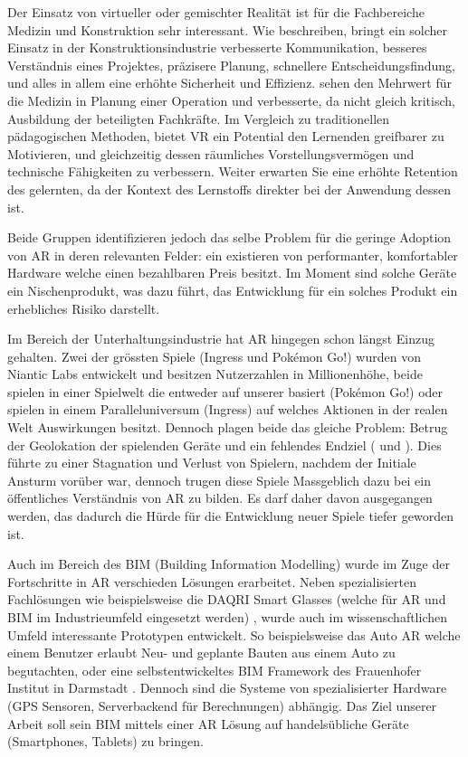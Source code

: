 \documentclass[a4paper]{scrreprt}
\begin{document}
Der Einsatz von virtueller oder gemischter Realität ist für die Fachbereiche Medizin und Konstruktion sehr interessant. Wie \citeauthor{Piroozfar2018} beschreiben, bringt ein solcher Einsatz in der Konstruktionsindustrie verbesserte Kommunikation, besseres Verständnis eines Projektes, präzisere Planung, schnellere Entscheidungsfindung, und alles in allem eine erhöhte Sicherheit und Effizienz. \citeauthor{Pelargos2017} sehen den Mehrwert für die Medizin in Planung einer Operation und verbesserte, da nicht gleich kritisch, Ausbildung der beteiligten Fachkräfte. Im Vergleich zu traditionellen pädagogischen Methoden, bietet VR ein Potential den Lernenden greifbarer zu Motivieren, und gleichzeitig dessen räumliches Vorstellungsvermögen und technische Fähigkeiten zu verbessern. Weiter erwarten Sie eine erhöhte Retention des gelernten, da der Kontext des Lernstoffs direkter bei der Anwendung dessen ist.

Beide Gruppen identifizieren jedoch das selbe Problem für die geringe Adoption von AR in deren relevanten Felder: ein existieren von performanter, komfortabler Hardware welche einen bezahlbaren Preis besitzt. Im Moment sind solche Geräte ein Nischenprodukt, was dazu führt, das Entwicklung für ein solches Produkt ein erhebliches Risiko darstellt.

Im Bereich der Unterhaltungsindustrie hat AR hingegen schon längst Einzug gehalten. Zwei der grössten Spiele (Ingress und Pokémon Go!) wurden von Niantic Labs entwickelt und besitzen Nutzerzahlen in Millionenhöhe, beide spielen in einer Spielwelt die entweder auf unserer basiert (Pokémon Go!) oder spielen in einem Paralleluniversum (Ingress) auf welches Aktionen in der realen Welt Auswirkungen besitzt. Dennoch plagen beide das gleiche Problem: Betrug der Geolokation der spielenden Geräte und ein fehlendes Endziel (\cite{MRRX2015} und \cite{KamelBoulos2017}). Dies führte zu einer Stagnation und Verlust von Spielern, nachdem der Initiale Ansturm vorüber war, dennoch trugen diese Spiele Massgeblich dazu bei ein öffentliches Verständnis von AR zu bilden. Es darf daher davon ausgegangen werden, das dadurch die Hürde für die Entwicklung neuer Spiele tiefer geworden ist.

Auch im Bereich des BIM (Building Information Modelling) wurde im Zuge der Fortschritte in AR verschieden Lösungen erarbeitet. Neben spezialisierten Fachlösungen wie beispielsweise die DAQRI Smart Glasses (welche für AR und BIM im Industrieumfeld eingesetzt werden) \parencite{DAQRI2018}, wurde auch im wissenschaftlichen Umfeld interessante Prototypen entwickelt. So beispielsweise das Auto AR \parencite{Opperman2015} welche einem Benutzer erlaubt Neu- und geplante Bauten aus einem Auto zu begutachten, oder eine selbstentwickeltes BIM Framework des Frauenhofer Institut in Darmstadt \parencite{Olbrich2013}. Dennoch sind die Systeme von spezialisierter Hardware (GPS Sensoren, Serverbackend für Berechnungen) abhängig. Das Ziel unserer Arbeit soll sein BIM mittels einer AR Lösung auf handelsübliche Geräte (Smartphones, Tablets) zu bringen.
\end{document}
